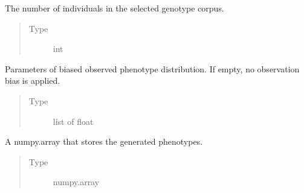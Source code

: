 \documentclass[a4paper,10pt,english]{sphinxhowto}
\begin{document}
\begin{fulllineitems}
\begin{fulllineitems}
\begin{quote}
\begin{description}
\end{description}\end{quote}

\end{fulllineitems}


\begin{fulllineitems}
\label{\detokenize{utils:utils.data_simulator.DataSimulator.total_num_inds}}
The number of individuals in the selected genotype corpus.
\begin{quote}\begin{description}
\item[{Type}] \leavevmode
int

\end{description}\end{quote}

\end{fulllineitems}


\begin{fulllineitems}
\label{\detokenize{utils:utils.data_simulator.DataSimulator.biased_distr}}
Parameters of biased observed phenotype distribution. If empty, no observation bias is applied.
\begin{quote}\begin{description}
\item[{Type}] \leavevmode
list of float

\end{description}\end{quote}

\end{fulllineitems}


\begin{fulllineitems}
\label{\detokenize{utils:utils.data_simulator.DataSimulator.phenotype}}
A numpy.array that stores the generated phenotypes.
\begin{quote}\begin{description}
\item[{Type}] \leavevmode
numpy.array


\end{description}
\end{quote}
\end{fulllineitems}
\end{fulllineitems}
\end{document}
